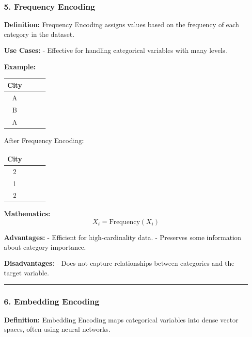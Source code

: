 \documentclass[12pt]{book}
\begin{document}
\subsubsection{\texorpdfstring{5. \textbf{Frequency
Encoding}}{5. Frequency Encoding}}\label{frequency-encoding}

\textbf{Definition:} Frequency Encoding assigns values based on the
frequency of each category in the dataset.

\textbf{Use Cases:} - Effective for handling categorical variables with
many levels.

\textbf{Example:} 

\begin{tabular}{|c|c|c|c|}
  \hline
  \textbf{City} \\ \hline
  A \\ \hline
  B \\ \hline
  A \\ \hline
\end{tabular}


After Frequency Encoding: 

\begin{tabular}{|c|c|c|c|}
  \hline
  \textbf{City} \\ \hline
  2 \\ \hline
  1 \\ \hline
  2 \\ \hline
\end{tabular}


\textbf{Mathematics:} \[ X_{i} = \text{Frequency}(X_{i}) \]

\textbf{Advantages:} - Efficient for high-cardinality data. - Preserves
some information about category importance.

\textbf{Disadvantages:} - Does not capture relationships between
categories and the target variable.

\begin{center}\rule{0.5\linewidth}{0.5pt}\end{center}

\subsubsection{\texorpdfstring{6. \textbf{Embedding
Encoding}}{6. Embedding Encoding}}\label{embedding-encoding}

\textbf{Definition:} Embedding Encoding maps categorical variables into
dense vector spaces, often using neural networks.
\end{document}
